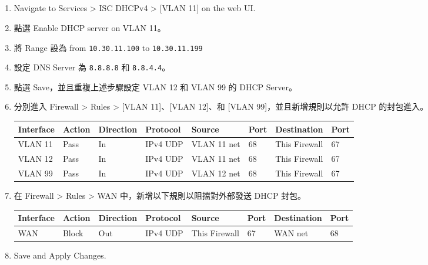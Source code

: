 \documentclass[12pt]{article}
\begin{document}
\subsection{}
\begin{enumerate}
  \item Navigate to Services > ISC DHCPv4 > [VLAN 11] on the web UI.
  \item 點選 Enable DHCP server on VLAN 11。
  \item 將 Range 設為 from \texttt{10.30.11.100} to \texttt{10.30.11.199}
  \item 設定 DNS Server 為 \texttt{8.8.8.8} 和 \texttt{8.8.4.4}。
  \item 點選 Save，並且重複上述步驟設定 VLAN 12 和 VLAN 99 的 DHCP Server。
  \item 分別進入 Firewall > Rules > [VLAN 11]、[VLAN 12]、和 [VLAN 99]，並且新增規則以允許 DHCP 的封包進入。
    \begin{table}[H]
      \centering
      \begin{tabular}{llllllll}
        \toprule
        \textbf{Interface} & \textbf{Action} & \textbf{Direction} & \textbf{Protocol} & \textbf{Source} & \textbf{Port} & \textbf{Destination} & \textbf{Port} \\
        \midrule
        VLAN 11 & Pass & In & IPv4 UDP & VLAN 11 net & 68 & This Firewall & 67 \\
        VLAN 12 & Pass & In & IPv4 UDP & VLAN 11 net & 68 & This Firewall & 67 \\
        VLAN 99 & Pass & In & IPv4 UDP & VLAN 12 net & 68 & This Firewall & 67 \\
        \bottomrule
      \end{tabular}
    \end{table}
  \item 在 Firewall > Rules > WAN 中，新增以下規則以阻擋對外部發送 DHCP 封包。
    \begin{table}[H]
      \centering
      \begin{tabular}{llllllll}
        \toprule
        \textbf{Interface} & \textbf{Action} & \textbf{Direction} & \textbf{Protocol} & \textbf{Source} & \textbf{Port} & \textbf{Destination} & \textbf{Port} \\
        \midrule
        WAN & Block & Out & IPv4 UDP & This Firewall & 67 & WAN net & 68 \\
        \bottomrule
      \end{tabular}
    \end{table}
  \item Save and Apply Changes.
\end{enumerate}
\clearpage
\end{document}
